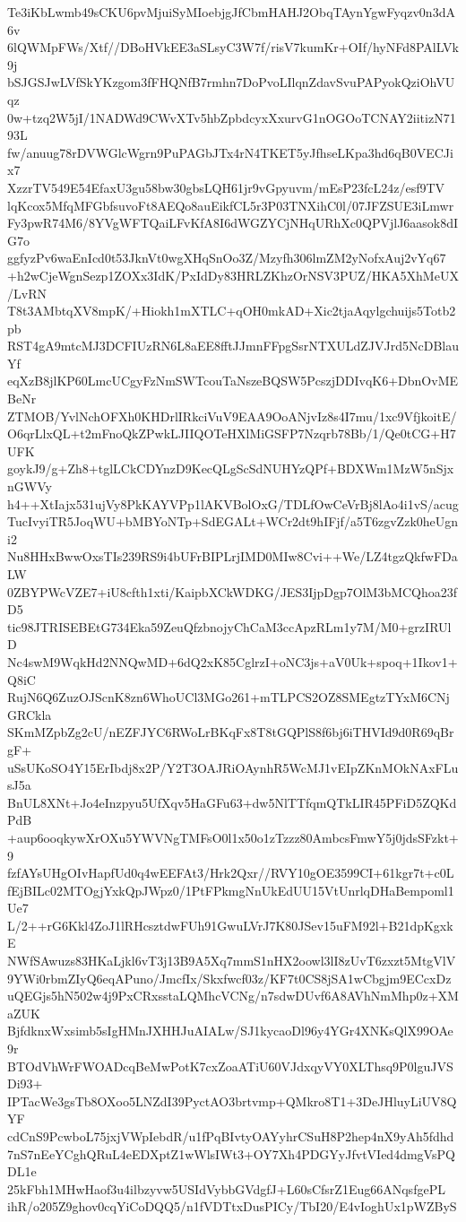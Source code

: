 Te3iKbLwmb49sCKU6pvMjuiSyMIoebjgJfCbmHAHJ2ObqTAynYgwFyqzv0n3dA6v
6lQWMpFWs/Xtf//DBoHVkEE3aSLsyC3W7f/risV7kumKr+OIf/hyNFd8PAlLVk9j
bSJGSJwLVfSkYKzgom3fFHQNfB7rmhn7DoPvoLIlqnZdavSvuPAPyokQziOhVUqz
0w+tzq2W5jI/1NADWd9CWvXTv5hbZpbdcyxXxurvG1nOGOoTCNAY2iitizN7193L
fw/anuug78rDVWGlcWgrn9PuPAGbJTx4rN4TKET5yJfhseLKpa3hd6qB0VECJix7
XzzrTV549E54EfaxU3gu58bw30gbsLQH61jr9vGpyuvm/mEsP23fcL24z/esf9TV
lqKcox5MfqMFGbfsuvoFt8AEQo8auEikfCL5r3P03TNXihC0l/07JFZSUE3iLmwr
Fy3pwR74M6/8YVgWFTQaiLFvKfA8I6dWGZYCjNHqURhXc0QPVjlJ6aasok8dIG7o
ggfyzPv6waEnIcd0t53JknVt0wgXHqSnOo3Z/Mzyfh306lmZM2yNofxAuj2vYq67
+h2wCjeWgnSezp1ZOXx3IdK/PxIdDy83HRLZKhzOrNSV3PUZ/HKA5XhMeUX/LvRN
T8t3AMbtqXV8mpK/+Hiokh1mXTLC+qOH0mkAD+Xic2tjaAqylgchuijs5Totb2pb
RST4gA9mtcMJ3DCFIUzRN6L8aEE8fftJJmnFFpgSsrNTXULdZJVJrd5NcDBlauYf
eqXzB8jlKP60LmcUCgyFzNmSWTcouTaNszeBQSW5PcszjDDIvqK6+DbnOvMEBeNr
ZTMOB/YvlNchOFXh0KHDrlIRkciVuV9EAA9OoANjvIz8s4I7mu/1xc9VfjkoitE/
O6qrLlxQL+t2mFnoQkZPwkLJIIQOTeHXlMiGSFP7Nzqrb78Bb/1/Qe0tCG+H7UFK
goykJ9/g+Zh8+tglLCkCDYnzD9KecQLgScSdNUHYzQPf+BDXWm1MzW5nSjxnGWVy
h4++XtIajx531ujVy8PkKAYVPp1lAKVBolOxG/TDLfOwCeVrBj8lAo4i1vS/acug
TucIvyiTR5JoqWU+bMBYoNTp+SdEGALt+WCr2dt9hIFjf/a5T6zgvZzk0heUgni2
Nu8HHxBwwOxsTIs239RS9i4bUFrBIPLrjIMD0MIw8Cvi++We/LZ4tgzQkfwFDaLW
0ZBYPWcVZE7+iU8cfth1xti/KaipbXCkWDKG/JES3IjpDgp7OlM3bMCQhoa23fD5
tic98JTRISEBEtG734Eka59ZeuQfzbnojyChCaM3ccApzRLm1y7M/M0+grzIRUlD
Nc4swM9WqkHd2NNQwMD+6dQ2xK85CglrzI+oNC3js+aV0Uk+spoq+1Ikov1+Q8iC
RujN6Q6ZuzOJScnK8zn6WhoUCl3MGo261+mTLPCS2OZ8SMEgtzTYxM6CNjGRCkla
SKmMZpbZg2cU/nEZFJYC6RWoLrBKqFx8T8tGQPlS8f6bj6iTHVId9d0R69qBrgF+
uSsUKoSO4Y15ErIbdj8x2P/Y2T3OAJRiOAynhR5WcMJ1vEIpZKnMOkNAxFLusJ5a
BnUL8XNt+Jo4eInzpyu5UfXqv5HaGFu63+dw5NlTTfqmQTkLIR45PFiD5ZQKdPdB
+aup6ooqkywXrOXu5YWVNgTMFsO0l1x50o1zTzzz80AmbcsFmwY5j0jdsSFzkt+9
fzfAYsUHgOIvHapfUd0q4wEEFAt3/Hrk2Qxr//RVY10gOE3599CI+61kgr7t+c0L
fEjBILc02MTOgjYxkQpJWpz0/1PtFPkmgNnUkEdUU15VtUnrlqDHaBempoml1Ue7
L/2++rG6Kkl4ZoJ1lRHcsztdwFUh91GwuLVrJ7K80JSev15uFM92l+B21dpKgxkE
NWfSAwuzs83HKaLjkl6vT3j13B9A5Xq7mmS1nHX2oowl3lI8zUvT6zxzt5MtgVlV
9YWi0rbmZIyQ6eqAPuno/JmcfIx/Skxfwcf03z/KF7t0CS8jSA1wCbgjm9ECcxDz
uQEGjs5hN502w4j9PxCRxsstaLQMhcVCNg/n7sdwDUvf6A8AVhNmMhp0z+XMaZUK
BjfdknxWxsimb5sIgHMnJXHHJuAIALw/SJ1kycaoDl96y4YGr4XNKsQlX99OAe9r
BTOdVhWrFWOADcqBeMwPotK7cxZoaATiU60VJdxqyVY0XLThsq9P0lguJVSDi93+
IPTacWe3gsTb8OXoo5LNZdI39PyctAO3brtvmp+QMkro8T1+3DeJHluyLiUV8QYF
cdCnS9PcwboL75jxjVWpIebdR/u1fPqBIvtyOAYyhrCSuH8P2hep4nX9yAh5fdhd
7nS7nEeYCghQRuL4eEDXptZ1wWlsIWt3+OY7Xh4PDGYyJfvtVIed4dmgVsPQDL1e
25kFbh1MHwHaof3u4ilbzyvw5USIdVybbGVdgfJ+L60sCfsrZ1Eug66ANqsfgePL
ihR/o205Z9ghov0cqYiCoDQQ5/n1fVDTtxDusPICy/TbI20/E4vIoghUx1pWZByS
